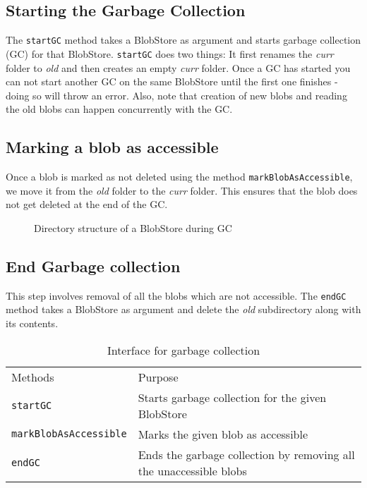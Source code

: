 \subsection{Starting the Garbage Collection}
The \texttt{startGC} method takes a BlobStore as argument and starts garbage collection (GC) for that BlobStore.
\texttt{startGC} does two things: It first renames the \textit{curr} folder to \textit{old} and then creates an empty \textit{curr} folder.
Once a GC has started you can not start another GC on the same BlobStore until the first one finishes - doing so will throw an error. Also, note that creation of new blobs and reading the old blobs can happen concurrently with the GC.

\subsection{Marking a blob as accessible}
Once a blob is marked as not deleted using the method \texttt{markBlobAsAccessible}, we move it from the \textit{old} folder to the \textit{curr} folder. This ensures that the blob does not get deleted at the end of the GC.

\begin{figure}[hbt]
  \caption{Directory structure of a BlobStore during GC}
  \label{fig:blobstore-dirstructure-gc}
\end{figure}

\subsection{End Garbage collection}
This step involves removal of all the blobs which are not accessible. The \texttt{endGC} method takes a BlobStore as argument and delete the \textit{old} subdirectory along with its contents.

\begin{table}[hbt]
\caption{Interface for garbage collection}
\label{tab:interface-gc}
\begin{center}
  \begin{tabularx}{0.91\textwidth}{lX}
    \hline\noalign{\smallskip}
    Methods & Purpose \\
    \noalign{\smallskip}
    \hline
    \noalign{\smallskip}
    \texttt{startGC} & Starts garbage collection for the given BlobStore\\
    \texttt{markBlobAsAccessible} & Marks the given blob as accessible\\
    \texttt{endGC} & Ends the garbage collection by removing all the unaccessible blobs\\
    \hline
  \end{tabularx}
\end{center}
\end{table}
